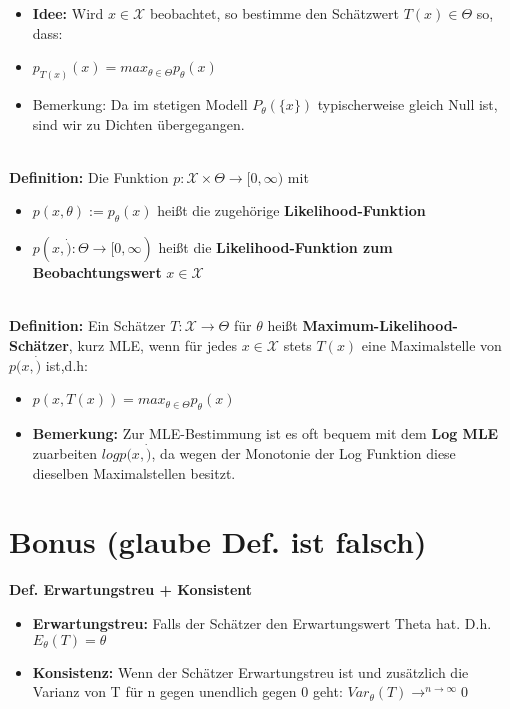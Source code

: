 \documentclass[a4paper,11pt]{scrartcl}
\begin{document}
\begin{itemize}
    \item \textbf{Idee:} Wird $x \in \mathcal{X}$ beobachtet, so bestimme den Schätzwert $T(x) \in \Theta$ so, dass:
    \item $p_{T(x)}(x) = max_{\theta \in \Theta}p_\theta (x)$
    \item Bemerkung: Da im stetigen Modell $P_\theta(\{x\})$ typischerweise gleich Null ist, sind wir zu Dichten übergegangen.
\end{itemize}

\textbf{\\Definition:}
Die Funktion $p :\mathcal{X} \times \Theta \rightarrow [0,\infty)$ mit
\begin{itemize}
    \item $p(x,\theta) := p_\theta(x)$ heißt die zugehörige \textbf{Likelihood-Funktion}
    \item $p(x, \dot): \Theta \rightarrow [0,\infty)$ heißt die \textbf{Likelihood-Funktion zum Beobachtungswert} $x \in \mathcal{X}$
\end{itemize}

\textbf{\\Definition:}
Ein Schätzer $T: \mathcal{X} \rightarrow \Theta$ für $\theta$ heißt \textbf{Maximum-Likelihood-Schätzer}, kurz MLE, wenn für jedes $x \in \mathcal{X}$ stets $T(x)$ eine Maximalstelle von $p(x, \dot)$ ist,d.h: 
\begin{itemize}
    \item $p(x,T(x)) = max_{\theta \in \Theta}p_\theta (x)$
    \item \textbf{Bemerkung:} Zur MLE-Bestimmung ist es oft bequem mit dem \textbf{Log MLE} zuarbeiten $log p(x, \dot)$, da wegen der Monotonie der Log Funktion diese dieselben Maximalstellen besitzt.
\end{itemize}

\section{Bonus (glaube Def. ist falsch)}
\textbf{Def. Erwartungstreu + Konsistent}
\begin{itemize}
    \item \textbf{Erwartungstreu:} Falls der Schätzer den Erwartungswert Theta hat. D.h. $E_\theta(T) = \theta$
    \item \textbf{Konsistenz:} Wenn der Schätzer Erwartungstreu ist und zusätzlich die Varianz von T für n gegen unendlich gegen 0 geht: $Var_\theta(T) \rightarrow^{n \rightarrow \infty} 0$
\end{itemize}
\end{document}
